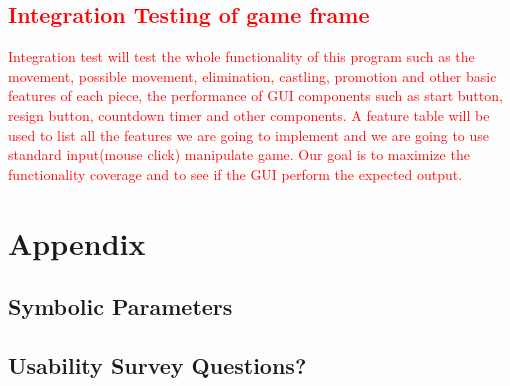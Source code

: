 \documentclass[12pt, titlepage]{article}
\begin{document}
\textcolor{red}{
\subsection{Integration Testing of game frame}
Integration test will test the whole functionality of this program such as the movement, possible movement, elimination, castling, promotion and other basic features of each piece, the performance of GUI components such as start button, resign button, countdown timer and other components. A feature table will be used to list all the features we are going to implement and we are going to use standard input(mouse click) manipulate game. Our goal is to maximize the functionality coverage and to see if the GUI perform the expected output. 
}


\newpage

\section{Appendix}



\subsection{Symbolic Parameters}


\subsection{Usability Survey Questions?}

 
 
\end{document}
